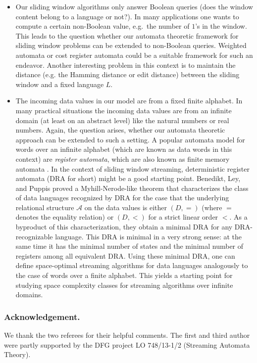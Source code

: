 \documentclass{article}\usepackage[a4paper,margin=20mm]{geometry}
\begin{document}
\begin{itemize}
\item Our sliding window algorithms only answer Boolean queries (does the window content belong to a language or not?).
In many applications one wants to compute a certain non-Boolean value, e.g.~the number of $1$'s in the window.
This leads to the question whether our automata theoretic framework for sliding window problems can be extended
to non-Boolean queries. Weighted automata \cite{DrosteKV09} or cost register automata \cite{AlurDDRY13} could be a suitable framework for such an endeavor. 
Another interesting problem in this context is to maintain the distance (e.g. the Hamming distance or edit distance) between the sliding window and a fixed language $L$.
\item The incoming data values in our model are from a fixed finite alphabet. In many practical situations the incoming
data values are from an infinite domain (at least on an abstract level) like the natural numbers or real numbers.
Again, the question arises, whether our automata theoretic approach can be extended to such a setting. 
A popular automata model for words over an infinite alphabet (which are known as data words in this context)
are {\em register automata}, which are also known as finite memory automata \cite{KaminskiF94,NevenSV04}.
In the context of sliding window streaming, deterministic register automata (DRA for short) \cite{FrancezK03} 
might be a good starting point. Benedikt, Ley, and Puppis
\cite{BenediktLP10} proved a Myhill-Nerode-like theorem that characterizes
the class of data languages recognized by DRA for the case that the underlying relational structure $\mathcal{A}$ 
on the data values is either $(D,=)$ (where $=$ denotes the equality relation) or $(D,<)$ for a strict linear order $<$.
As a byproduct of this characterization, they obtain a minimal DRA for any DRA-recognizable language. This DRA is minimal in a very strong 
sense: at the same time it has the minimal number of states and the minimal number of registers
among all equivalent DRA. Using these minimal DRA, one can define space-optimal streaming algorithms
for data languages analogously to the case of words over a finite alphabet. This yields a starting point for studying
space complexity classes for streaming algorithms over infinite domains. 
\end{itemize}

\subsubsection*{Acknowledgement.} We thank the two referees for their helpful comments. The first and third author were partly supported
by the DFG project LO 748/13-1/2 (Streaming Automata Theory).

\newpage

	
\end{document}
